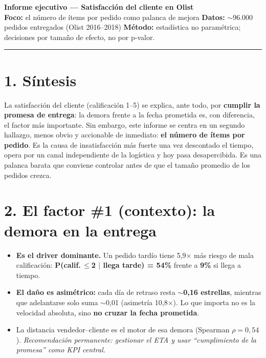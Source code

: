 \documentclass[10pt]{article}
\newcommand{\kpi}[1]{\textbf{\textcolor{azlt}{#1}}}            %
\newcommand{\lead}[1]{\textcolor{az}{\sffamily\bfseries #1}}   %
\begin{document}
\begin{center}
{\LARGE\bfseries\color{az} Informe ejecutivo --- Satisfacción del cliente en Olist}\\[3pt]
{\small\textbf{Foco:} el número de ítems por pedido como palanca de mejora \quad\textbullet\quad
\textbf{Datos:} $\sim$96.000 pedidos entregados (Olist 2016--2018) \quad\textbullet\quad
\textbf{Método:} estadística no paramétrica; decisiones por tamaño de efecto, no por p-valor.}
\end{center}
\vspace{-2pt}\hrule\vspace{4pt}

\section{1. Síntesis}
La satisfacción del cliente (calificación 1--5) se explica, ante todo, por \textbf{cumplir la promesa de entrega}: la demora frente a la fecha prometida es, con diferencia, el factor más importante. Sin embargo, este informe se centra en un segundo hallazgo, menos obvio y accionable de inmediato: \textbf{el número de ítems por pedido}. Es la causa de insatisfacción más fuerte una vez descontado el tiempo, opera por un canal independiente de la logística y hoy pasa desapercibida. Es una palanca barata que conviene controlar antes de que el tamaño promedio de los pedidos crezca.

\section{2. El factor \#1 (contexto): la demora en la entrega}
\begin{itemize}
\item \lead{Es el driver dominante.} Un pedido tardío tiene 5,9$\times$ más riesgo de mala calificación: \kpi{P(calif.\,$\le$2 $\mid$ llega tarde) = 54\%} frente a \textbf{9\%} si llega a tiempo.
\item \lead{El daño es asimétrico:} cada día de retraso resta $\sim$\kpi{0,16 estrellas}, mientras que adelantarse solo suma $\sim$0,01 (asimetría 10,8$\times$). Lo que importa no es la velocidad absoluta, sino \textbf{no cruzar la fecha prometida}.
\item La distancia vendedor--cliente es el motor de esa demora (Spearman \textbf{$\rho=0{,}54$}). \textit{Recomendación permanente: gestionar el ETA y usar ``cumplimiento de la promesa'' como KPI central.}
\end{itemize}
\end{document}
